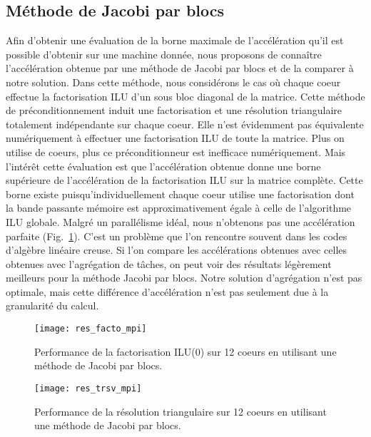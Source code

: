 \subsection{Méthode de Jacobi par blocs}
Afin d'obtenir une évaluation de la borne maximale de l'accélération qu'il est possible d'obtenir sur une machine donnée, nous proposons de connaître l'accélération obtenue par une méthode de Jacobi par blocs et de la comparer à notre solution.
%
Dans cette méthode, nous considérons le cas où chaque coeur effectue la factorisation ILU d'un sous bloc diagonal de la matrice.
%
Cette méthode de préconditionnement induit une factorisation et une résolution triangulaire totalement indépendante sur chaque coeur.
%
Elle n'est évidemment pas équivalente numériquement à effectuer une factorisation ILU de toute la matrice.
%
Plus on utilise de coeurs, plus ce préconditionneur est inefficace numériquement\cite{domain_decomp}.
%
Mais l'intérêt cette évaluation est que l'accélération obtenue donne une borne supérieure de l'accélération de la factorisation ILU sur la matrice complète.
%
Cette borne existe puisqu’individuellement chaque coeur utilise une factorisation dont la bande passante mémoire est approximativement égale à celle de l'algorithme ILU globale.
%
Malgré un parallélisme idéal, nous n'obtenons pas une accélération parfaite (Fig.~\ref{fig:res_facto_mpi}).
%
C'est un problème que l'on rencontre souvent dans les codes d'algèbre linéaire creuse.
%
Si l'on compare les accélérations obtenues avec celles obtenues avec l'agrégation de tâches, on peut voir des résultats légèrement meilleurs pour la méthode Jacobi par blocs.
%
Notre solution d'agrégation n'est pas optimale, mais cette différence d'accélération n'est pas seulement due à la granularité du calcul.

\begin{figure}
  \centering
  \texttt{[image: res\_facto\_mpi]}
  \caption{Performance de la factorisation ILU(0) sur 12 coeurs en utilisant une méthode de Jacobi par blocs.}
  \label{fig:res_facto_mpi}
\end{figure}
\begin{figure}
  \centering
  \texttt{[image: res\_trsv\_mpi]}
  \caption{Performance de la résolution triangulaire sur 12 coeurs en utilisant une méthode de Jacobi par blocs.}
  \label{fig:res_trsv_mpi}
\end{figure}

